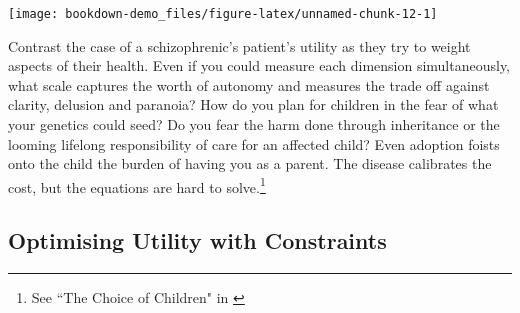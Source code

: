 \documentclass[]{tufte-book}
\newenvironment{Shaded}{}{}
\newcommand{\ControlFlowTok}[1]{\textcolor[rgb]{0.00,0.44,0.13}{\textbf{#1}}}
\newcommand{\DecValTok}[1]{\textcolor[rgb]{0.25,0.63,0.44}{#1}}
\newcommand{\FloatTok}[1]{\textcolor[rgb]{0.25,0.63,0.44}{#1}}
\newcommand{\KeywordTok}[1]{\textcolor[rgb]{0.00,0.44,0.13}{\textbf{#1}}}
\newcommand{\NormalTok}[1]{#1}
\newcommand{\OperatorTok}[1]{\textcolor[rgb]{0.40,0.40,0.40}{#1}}
\newcommand{\SpecialCharTok}[1]{\textcolor[rgb]{0.25,0.44,0.63}{#1}}
\newcommand{\StringTok}[1]{\textcolor[rgb]{0.25,0.44,0.63}{#1}}
\newcommand{\VerbatimStringTok}[1]{\textcolor[rgb]{0.25,0.44,0.63}{#1}}
\theoremstyle{definition}
\theoremstyle{definition}
\theoremstyle{definition}
\theoremstyle{remark}
\begin{document}
\begin{Shaded}
\end{Shaded}

\texttt{[image: bookdown-demo\_files/figure-latex/unnamed-chunk-12-1]}

Contrast the case of a schizophrenic's patient's utility as they try to weight aspects of their health. Even if you could measure each dimension simultaneously, what scale captures the worth of autonomy and measures the trade off against clarity, delusion and paranoia? How do you plan for children in the fear of what your genetics could seed? Do you fear the harm done through inheritance or the looming lifelong responsibility of care for an affected child? Even adoption foists onto the child the burden of having you as a parent. The disease calibrates the cost, but the equations are hard to solve.\footnote{See ``The Choice of Children" in \citep{WangSchizophrenia}}

\hypertarget{optimising-utility-with-constraints}{%
\subsection{Optimising Utility with Constraints}\label{optimising-utility-with-constraints}}
\end{document}
